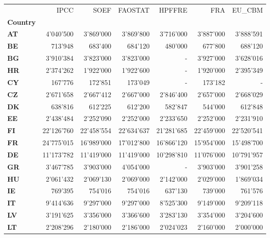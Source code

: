 \begin{tabular}{lrrrrrr}
\toprule
{} &       IPCC &       SOEF &    FAOSTAT &     HPFFRE &        FRA &     EU\_CBM \\
\textbf{Country} &            &            &            &            &            &            \\
\midrule
\textbf{AT     } &  4'040'500 &  3'869'000 &  3'869'800 &  3'716'000 &  3'887'000 &  3'888'591 \\
\textbf{BE     } &    713'948 &    683'400 &    684'120 &    480'000 &    677'800 &    688'120 \\
\textbf{BG     } &  3'910'384 &  3'823'000 &  3'823'000 &          - &  3'927'000 &  3'628'016 \\
\textbf{HR     } &  2'374'262 &  1'922'000 &  1'922'600 &          - &  1'920'000 &  2'395'349 \\
\textbf{CY     } &    167'776 &    172'851 &    173'049 &          - &    173'182 &          - \\
\textbf{CZ     } &  2'671'658 &  2'667'412 &  2'667'000 &  2'846'400 &  2'657'000 &  2'668'029 \\
\textbf{DK     } &    638'816 &    612'225 &    612'200 &    582'847 &    544'000 &    612'848 \\
\textbf{EE     } &  2'438'484 &  2'252'090 &  2'252'000 &  2'233'650 &  2'252'000 &  2'231'910 \\
\textbf{FI     } & 22'126'760 & 22'458'554 & 22'634'637 & 21'281'685 & 22'459'000 & 22'520'541 \\
\textbf{FR     } & 24'775'015 & 16'989'000 & 17'012'800 & 16'866'120 & 15'954'000 & 15'498'700 \\
\textbf{DE     } & 11'173'782 & 11'419'000 & 11'419'000 & 10'298'810 & 11'076'000 & 10'791'957 \\
\textbf{GR     } &  3'467'785 &  3'903'000 &  4'054'000 &          - &  3'903'000 &  3'901'258 \\
\textbf{HU     } &  2'061'432 &  2'069'130 &  2'069'000 &  2'142'000 &  2'029'000 &  1'869'034 \\
\textbf{IE     } &    769'395 &    754'016 &    754'016 &    637'130 &    739'000 &    761'576 \\
\textbf{IT     } &  9'414'636 &  9'297'000 &  9'297'000 &  8'525'300 &  9'149'000 &  9'209'118 \\
\textbf{LV     } &  3'191'625 &  3'356'000 &  3'366'600 &  3'283'130 &  3'354'000 &  3'204'600 \\
\textbf{LT     } &  2'208'296 &  2'180'000 &  2'186'000 &  2'024'023 &  2'160'000 &  2'000'000 \\

\end{tabular}
